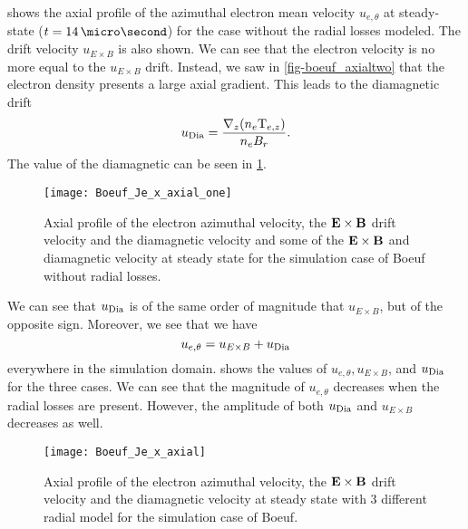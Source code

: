  shows the axial profile of the azimuthal electron mean velocity $u_{e, \theta}$ at steady-state ($t = 14\,\micro\second$) for the case without the radial losses modeled.
The drift velocity $u_{E \times B}$ is also shown.
We can see that the electron velocity is no more equal to the $u_{E \times B}$ drift.
Instead, we saw in \cref{fig-boeuf_axialtwo} that the electron density presents a large axial gradient.
This leads to the diamagnetic drift
$$u_{\rm Dia}=\frac{\nabla_z (n_e {\rm T}_{e,z})}{n_e B_r}.$$
The value of the diamagnetic can be seen in \cref{fig-Jetheta_sum}.


\begin{figure}[hbtp]
  \centering
  \texttt{[image: Boeuf\_Je\_x\_axial\_one]}
  \caption{Axial profile of the electron azimuthal velocity, the ${\mathbf E} \times {\mathbf B}$ drift velocity and the diamagnetic velocity and some of the ${\mathbf E} \times {\mathbf B}$ and diamagnetic velocity at steady state for the simulation case of Boeuf without radial losses.}
  \label{fig-Jetheta_sum}
\end{figure}

We can see that $u_{\rm Dia}$ is of the same order of magnitude that $u_{E \times B}$, but of the opposite sign.
Moreover, we see that we have 
$$ u_{e, \theta} =   u_{E \times B} + u_{\rm Dia}$$
everywhere in the simulation domain.
 shows the values of $ u_{e, \theta},   u_{E \times B}$, and $u_{\rm Dia}$ for the three cases.
We can see that the magnitude of $u_{e, \theta} $ decreases when the radial losses are present.
However, the amplitude of both $u_{\rm Dia}$ and $u_{E \times B}$ decreases as well.

 
\begin{figure}[hbtp]
  \centering
  \texttt{[image: Boeuf\_Je\_x\_axial]}
  \caption{Axial profile of the electron azimuthal velocity, the ${\mathbf E} \times {\mathbf B}$ drift velocity and the diamagnetic velocity at steady state with 3 different radial model for the simulation case of Boeuf.}
  \label{fig-Jetheta}
\end{figure}

